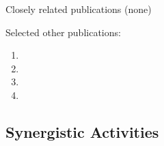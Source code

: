 

\noindent Closely related publications (none)

\noindent
\noindent Selected other publications:
\begin{enumerate}\itemsep 0pt
  \item {}
  \item {}
  \item {}
  \item {}
\end{enumerate}

\subsection*{Synergistic Activities}


